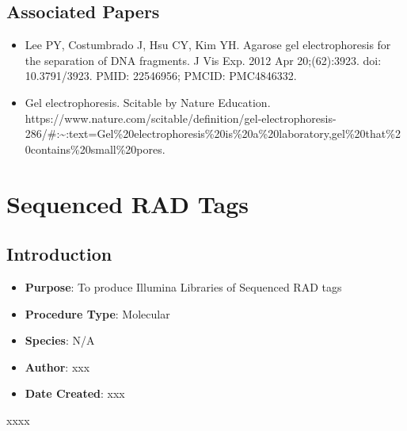 \documentclass[
  letterpaper,
  DIV=11,
  numbers=noendperiod]{scrreprt}
\providecommand{\tightlist}{%
  \setlength{\itemsep}{0pt}\setlength{\parskip}{0pt}}\usepackage{longtable,booktabs,array}
\begin{document}
\hypertarget{associated-papers-14}{%
\section{Associated Papers}\label{associated-papers-14}}

\begin{itemize}
\tightlist
\item
  Lee PY, Costumbrado J, Hsu CY, Kim YH. Agarose gel electrophoresis for
  the separation of DNA fragments. J Vis Exp. 2012 Apr 20;(62):3923.
  doi: 10.3791/3923. PMID: 22546956; PMCID: PMC4846332.
\item
  Gel electrophoresis. Scitable by Nature Education.
  https://www.nature.com/scitable/definition/gel-electrophoresis-286/\#:\textasciitilde:text=Gel\%20electrophoresis\%20is\%20a\%20laboratory,gel\%20that\%20contains\%20small\%20pores.
\end{itemize}

\hypertarget{sec-molecular-RADseq}{%
\chapter{Sequenced RAD Tags}\label{sec-molecular-RADseq}}

\hypertarget{introduction-23}{%
\section{Introduction}\label{introduction-23}}

\begin{itemize}
\tightlist
\item
  \textbf{Purpose}: To produce Illumina Libraries of Sequenced RAD tags
\item
  \textbf{Procedure Type}: Molecular
\item
  \textbf{Species}: N/A
\item
  \textbf{Author}: xxx
\item
  \textbf{Date Created}: xxx
\end{itemize}

\begin{tcolorbox}[enhanced jigsaw, rightrule=.15mm, title=\textcolor{quarto-callout-warning-color}{\faExclamationTriangle}\hspace{0.5em}{NOTES}, titlerule=0mm, opacitybacktitle=0.6, toprule=.15mm, bottomrule=.15mm, opacityback=0, left=2mm, colframe=quarto-callout-warning-color-frame, breakable, coltitle=black, colback=white, colbacktitle=quarto-callout-warning-color!10!white, bottomtitle=1mm, leftrule=.75mm, toptitle=1mm, arc=.35mm]

xxxx

\end{tcolorbox}
\end{document}
